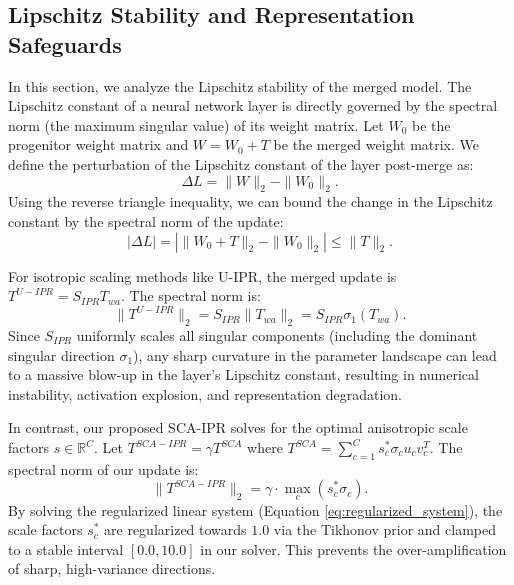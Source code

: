 \documentclass{article}
\theoremstyle{plain}
\theoremstyle{definition}
\theoremstyle{remark}
\begin{document}
\subsection{Lipschitz Stability and Representation Safeguards}
\label{sec:appendix_lipschitz}

In this section, we analyze the Lipschitz stability of the merged model. The Lipschitz constant of a neural network layer is directly governed by the spectral norm (the maximum singular value) of its weight matrix. 
Let $W_0$ be the progenitor weight matrix and $W = W_0 + T$ be the merged weight matrix. 
We define the perturbation of the Lipschitz constant of the layer post-merge as:
\begin{equation}
    \Delta L = \|W\|_2 - \|W_0\|_2.
\end{equation}
Using the reverse triangle inequality, we can bound the change in the Lipschitz constant by the spectral norm of the update:
\begin{equation}
    |\Delta L| = |\|W_0 + T\|_2 - \|W_0\|_2| \le \|T\|_2.
\end{equation}

For isotropic scaling methods like U-IPR, the merged update is $T^{U-IPR} = S_{IPR} T_{wa}$. The spectral norm is:
\begin{equation}
    \|T^{U-IPR}\|_2 = S_{IPR} \|T_{wa}\|_2 = S_{IPR} \sigma_1(T_{wa}).
\end{equation}
Since $S_{IPR}$ uniformly scales all singular components (including the dominant singular direction $\sigma_1$), any sharp curvature in the parameter landscape can lead to a massive blow-up in the layer's Lipschitz constant, resulting in numerical instability, activation explosion, and representation degradation.

In contrast, our proposed SCA-IPR solves for the optimal anisotropic scale factors $s \in \mathbb{R}^C$. Let $T^{SCA-IPR} = \gamma T^{SCA}$ where $T^{SCA} = \sum_{c=1}^C s^*_c \sigma_c u_c v_c^T$. The spectral norm of our update is:
\begin{equation}
    \|T^{SCA-IPR}\|_2 = \gamma \cdot \max_{c} \left( s^*_c \sigma_c \right).
\end{equation}
By solving the regularized linear system (Equation \ref{eq:regularized_system}), the scale factors $s^*_c$ are regularized towards $1.0$ via the Tikhonov prior and clamped to a stable interval $[0.0, 10.0]$ in our solver. This prevents the over-amplification of sharp, high-variance directions.
\end{document}
